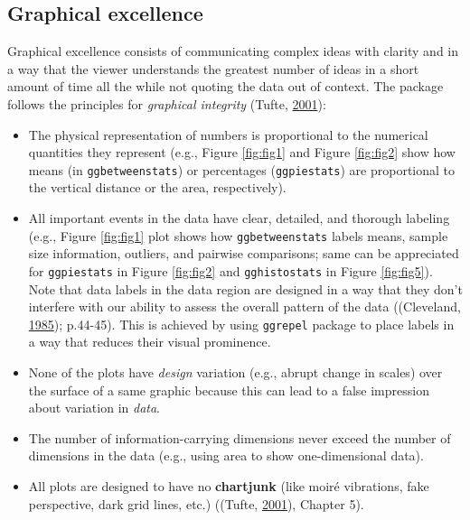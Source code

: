 \documentclass[
]{article}
\begin{document}
\hypertarget{graphical-excellence}{%
\subsection{Graphical excellence}\label{graphical-excellence}}

Graphical excellence consists of communicating complex ideas with clarity and in
a way that the viewer understands the greatest number of ideas in a short amount
of time all the while not quoting the data out of context. The package follows
the principles for \emph{graphical integrity} (Tufte, \protect\hyperlink{ref-tufteVisualDisplayQuantitative2001}{2001}):

\begin{itemize}
\item
  The physical representation of numbers is proportional to the numerical
  quantities they represent (e.g., Figure \ref{fig:fig1} and Figure
  \ref{fig:fig2} show how means (in \texttt{ggbetweenstats}) or percentages
  (\texttt{ggpiestats}) are proportional to the vertical distance or the area,
  respectively).
\item
  All important events in the data have clear, detailed, and thorough labeling
  (e.g., Figure \ref{fig:fig1} plot shows how \texttt{ggbetweenstats} labels means,
  sample size information, outliers, and pairwise comparisons; same can be
  appreciated for \texttt{ggpiestats} in Figure \ref{fig:fig2} and \texttt{gghistostats} in
  Figure \ref{fig:fig5}). Note that data labels in the data region are
  designed in a way that they don't interfere with our ability to assess the
  overall pattern of the data ((Cleveland, \protect\hyperlink{ref-clevelandElementsGraphingData1985}{1985});
  p.44-45). This is achieved by using \texttt{ggrepel} package to place labels in a
  way that reduces their visual prominence.
\item
  None of the plots have \emph{design} variation (e.g., abrupt change in scales)
  over the surface of a same graphic because this can lead to a false
  impression about variation in \emph{data}.
\item
  The number of information-carrying dimensions never exceed the number of
  dimensions in the data (e.g., using area to show one-dimensional data).
\item
  All plots are designed to have no \textbf{chartjunk} (like moiré vibrations, fake
  perspective, dark grid lines, etc.)
  ((Tufte, \protect\hyperlink{ref-tufteVisualDisplayQuantitative2001}{2001}), Chapter 5).
\end{itemize}
\end{document}
